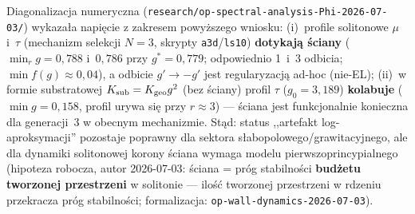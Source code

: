 \begin{remark}%
\label{rem:ghost-artifact-scope-CP7}
Diagonalizacja numeryczna
(\texttt{research/op-spectral-analysis-Phi-2026-07-03/}) wykazała
napięcie z zakresem powyższego wniosku:
(i)~profile solitonowe $\mu$ i~$\tau$ (mechanizm selekcji $N{=}3$,
skrypty \texttt{a3d}/\texttt{ls10}) \textbf{dotykają ściany}
($\min_r g = 0{,}788$ i~$0{,}786$ przy $g^*=0{,}779$; odpowiednio 1~i~3
odbicia; $\min f(g) \approx 0{,}04$), a odbicie $g'\to-g'$ jest
regularyzacją ad-hoc (nie-EL);
(ii)~w formie substratowej $K_{\rm sub}=K_{\rm geo}g^2$ (bez ściany)
profil $\tau$ ($g_0=3{,}189$) \textbf{kolabuje} ($\min g = 0{,}158$,
profil urywa się przy $r\approx 3$) --- ściana jest funkcjonalnie
konieczna dla generacji~3 w obecnym mechanizmie.
Stąd: status ,,artefakt log-aproksymacji'' pozostaje poprawny dla
sektora słabopolowego/grawitacyjnego, ale dla dynamiki solitonowej
korony ściana wymaga modelu pierwszoprincypialnego (hipoteza robocza,
autor 2026-07-03: ściana = próg stabilności \textbf{budżetu tworzonej
przestrzeni} w solitonie --- ilość tworzonej przestrzeni w rdzeniu
przekracza próg stabilności; formalizacja:
\texttt{op-wall-dynamics-2026-07-03}).
\end{remark}

